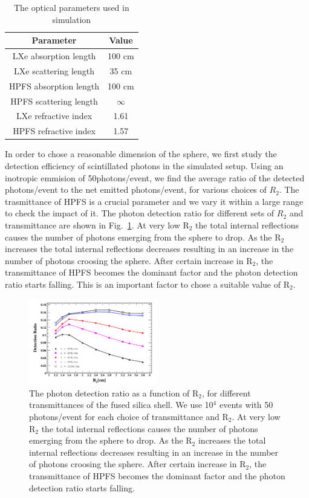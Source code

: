 \begin{table}[h]
  \centering
  \caption{The optical parameters used in simulation}
  \label{tab:OptPar}
  \begin{tabular}{|c|c|}
  \hline
  Parameter & Value\\
  \hline
  LXe absorption length & 100 cm\\
  \hline
  LXe scattering length & 35 cm\\
  \hline
  HPFS absorption length & 100 cm\\
  \hline
  HPFS scattering length & $\infty$ \\
  \hline
  LXe refractive index & 1.61 \\
  \hline
  HPFS refractive index & 1.57 \\
  \hline
  \end{tabular}
\end{table}

In order to chose a reasonable dimension of the sphere, we first study the detection efficiency of 
scintillated photons in the simulated setup. Using an inotropic emmision of 50photons/event, we find 
the average ratio of the detected photons/event to the net emitted photons/event, for various choices 
of $R_{2}$. The trasmittance of HPFS is a crucial parameter and we vary it within a large range to 
check the impact of it. The photon detection ratio for different sets of $R_{2}$ and transmittance are 
shown in Fig.~\ref{fig:pdr}.  At very low R$_{2}$ the total internal reflections causes the number of photons emerging from 
the sphere to drop. As the R$_{2}$ increases the total internal reflections decreases resulting in an 
increase in the number of photons croosing the sphere. After certain increase in R$_{2}$, the transmittance 
of HPFS becomes the dominant factor and the photon detection ratio starts falling. This is an important factor 
to chose a suitable value of R$_{2}$.

\begin{figure}
   \centering
   \includegraphics[width=0.5\textwidth]{pdr.png}
   \caption{The photon detection ratio as a function of R$_{2}$, for different transmittances of 
   the fused silica shell. We use 10$^4$ events with 50 photons/event for each choice of transmittance 
   and R$_{2}$. At very low R$_{2}$ the total internal reflections causes the number of photons emerging from 
   the sphere to drop. As the R$_{2}$ increases the total internal reflections decreases resulting in an 
   increase in the number of photons croosing the sphere. After certain increase in R$_{2}$, the transmittance 
   of HPFS becomes the dominant factor and the photon detection ratio starts falling.}
   \label{fig:pdr}
\end{figure}

